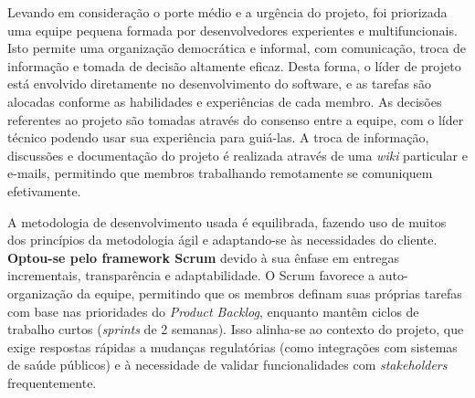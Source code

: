\documentclass[a5paper, 12pt]{article}
\begin{document}
Levando em consideração o porte médio e a urgência do projeto, foi priorizada uma equipe pequena formada por desenvolvedores experientes e multifuncionais. Isto permite uma organização democrática e informal, com comunicação, troca de informação e tomada de decisão altamente eficaz. Desta forma, o líder de projeto está envolvido diretamente no desenvolvimento do software, e as tarefas são alocadas conforme as habilidades e experiências de cada membro. As decisões referentes ao projeto são tomadas através do consenso entre a equipe, com o líder técnico podendo usar sua experiência para guiá-las. A troca de informação, discussões e documentação do projeto é realizada através de uma \textit{wiki} particular e e-mails, permitindo que membros trabalhando remotamente se comuniquem efetivamente.

A metodologia de desenvolvimento usada é equilibrada, fazendo uso de muitos dos princípios da metodologia ágil e adaptando-se às necessidades do cliente. \textbf{Optou-se pelo framework Scrum} devido à sua ênfase em entregas incrementais, transparência e adaptabilidade. O Scrum favorece a auto-organização da equipe, permitindo que os membros definam suas próprias tarefas com base nas prioridades do \textit{Product Backlog}, enquanto mantêm ciclos de trabalho curtos (\textit{sprints} de 2 semanas). Isso alinha-se ao contexto do projeto, que exige respostas rápidas a mudanças regulatórias (como integrações com sistemas de saúde públicos) e à necessidade de validar funcionalidades com \textit{stakeholders} frequentemente. 
\end{document}
